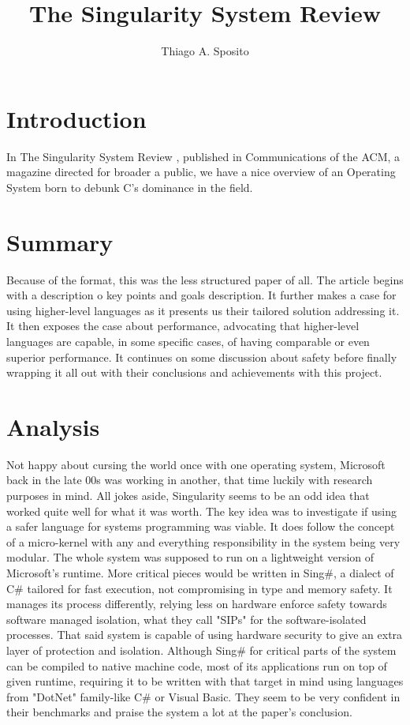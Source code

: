\documentclass[12pt]{article}
\title{The Singularity System Review}
\author{Thiago A. Sposito\inst{1} }
\begin{document}
 

\maketitle


\section{Introduction}

In The Singularity System Review \cite{larus2010singularity}, published in Communications of the ACM, a magazine directed for broader a public, we have a nice overview of an Operating System born to debunk C's dominance in the field.

\section{Summary}
Because of the format, this was the less structured paper of all. The article begins with a description o key points and goals description. It further makes a case for using higher-level languages as it presents us their tailored solution addressing it. It then exposes the case about performance, advocating that higher-level languages are capable, in some specific cases, of having comparable or even superior performance. It continues on some discussion about safety before finally wrapping it all out with their conclusions and achievements with this project.


\section{Analysis}
Not happy about cursing the world once with one operating system, Microsoft back in the late 00s was working in another, that time luckily with research purposes in mind. All jokes aside, Singularity seems to be an odd idea that worked quite well for what it was worth. The key idea was to investigate if using a safer language for systems programming was viable. It does follow the concept of a micro-kernel with any and everything responsibility in the system being very modular. The whole system was supposed to run on a lightweight version of Microsoft's runtime. More critical pieces would be written in Sing#, a dialect of C# tailored for fast execution, not compromising in type and memory safety. It manages its process differently, relying less on hardware enforce safety towards software managed isolation, what they call "SIPs" for the software-isolated processes. That said system is capable of using hardware security to give an extra layer of protection and isolation. Although Sing# for critical parts of the system can be compiled to native machine code, most of its applications run on top of given runtime, requiring it to be written with that target in mind using languages from "DotNet" family-like C# or Visual Basic. They seem to be very confident in their benchmarks and praise the system a lot at the paper's conclusion.
\end{document}
